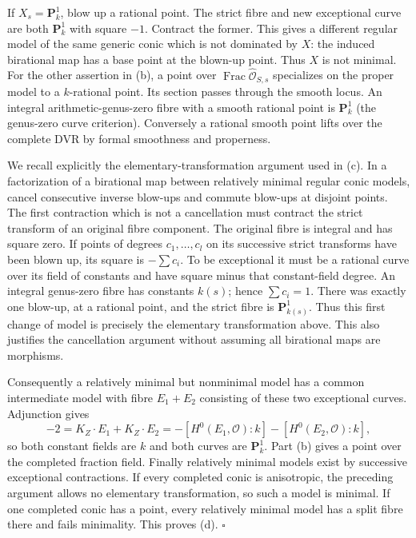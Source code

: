 \documentclass[11pt]{article}
\begin{document}
If $X_s=\mathbf P^1_k$, blow up a rational point. The strict fibre and new exceptional curve are both $\mathbf P^1_k$ with square $-1$. Contract the former. This gives a different regular model of the same generic conic which is not dominated by $X$: the induced birational map has a base point at the blown-up point. Thus $X$ is not minimal. For the other assertion in (b), a point over $\operatorname{Frac}\widehat{\mathcal O}_{S,s}$ specializes on the proper model to a $k$-rational point. Its section passes through the smooth locus. An integral arithmetic-genus-zero fibre with a smooth rational point is $\mathbf P^1_k$ (the genus-zero curve criterion). Conversely a rational smooth point lifts over the complete DVR by formal smoothness and properness.

We recall explicitly the elementary-transformation argument used in (c). In a factorization of a birational map between relatively minimal regular conic models, cancel consecutive inverse blow-ups and commute blow-ups at disjoint points. The first contraction which is not a cancellation must contract the strict transform of an original fibre component. The original fibre is integral and has square zero. If points of degrees $c_1,\ldots,c_l$ on its successive strict transforms have been blown up, its square is $-\sum c_i$. To be exceptional it must be a rational curve over its field of constants and have square minus that constant-field degree. An integral genus-zero fibre has constants $k(s)$; hence $\sum c_i=1$. There was exactly one blow-up, at a rational point, and the strict fibre is $\mathbf P^1_{k(s)}$. Thus this first change of model is precisely the elementary transformation above. This also justifies the cancellation argument without assuming all birational maps are morphisms.

Consequently a relatively minimal but nonminimal model has a common intermediate model with fibre $E_1+E_2$ consisting of these two exceptional curves. Adjunction gives
\[ -2=K_Z\cdot E_1+K_Z\cdot E_2
=-[H^0(E_1,\mathcal O):k]-[H^0(E_2,\mathcal O):k], \]
so both constant fields are $k$ and both curves are $\mathbf P^1_k$. Part (b) gives a point over the completed fraction field. Finally relatively minimal models exist by successive exceptional contractions. If every completed conic is anisotropic, the preceding argument allows no elementary transformation, so such a model is minimal. If one completed conic has a point, every relatively minimal model has a split fibre there and fails minimality. This proves (d). \hfill$\square$
\end{document}

